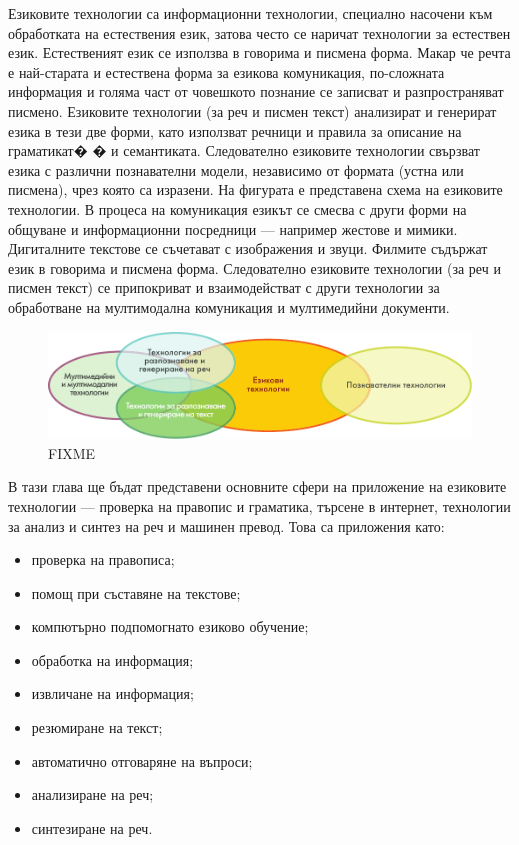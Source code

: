 \documentclass[]{../../metanetpaper}
\begin{document}
\begin{multicols}{2}

Езиковите технологии са информационни технологии, специално насочени към обработката на естествения език, затова често се наричат технологии за естествен език. Естественият език се използва в говорима и писмена форма. Макар че речта е най-старата и естествена форма за езикова комуникация, по-сложната информация и голяма част от човешкото познание се записват и разпространяват писмено. Езиковите технологии (за реч и писмен текст) анализират и генерират езика в тези две форми, като използват речници и правила за описание на граматикат�
 � и семантиката. Следователно езиковите технологии свързват езика с различни познавателни модели, независимо от формата (устна или писмена), чрез която са изразени.
На фигурата е представена схема на езиковите технологии. В процеса на комуникация езикът се смесва с други форми на общуване и информационни посредници — например жестове и мимики. Дигиталните текстове се съчетават с изображения и звуци. Филмите съдържат език в говорима и писмена форма. Следователно езиковите технологии (за реч и писмен текст) се припокриват и взаимодействат с други технологии за  обработване на мултимодална комуникация и мултимедийни документи. 

\begin{figure}[htb]
  \center
  \includegraphics[width=\textwidth]{../_media/bulgarian/language_technologies}
  \caption{FIXME}
  \label{fig:ltincontext_de}
\end{figure}

В тази глава  ще бъдат представени основните сфери на приложение на
езиковите технологии — проверка на правопис и граматика, търсене в
интернет, технологии за анализ и синтез на реч и машинен превод. Това
са приложения като: 

\begin{itemize}
\item проверка на правописа;
\item помощ при съставяне на текстове;
\item компютърно подпомогнато езиково обучение;
\item обработка на информация;
\item извличане на информация;
\item резюмиране на текст;
\item автоматично отговаряне на въпроси;
\item анализиране на реч;
\item синтезиране на реч.
\end{itemize}


\end{multicols}
\end{document}
